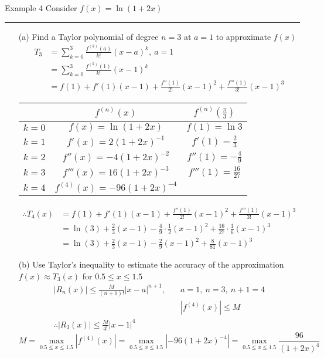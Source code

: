 \documentclass[12pt,a4paper]{article}
\begin{document}
\begin{eg}{Example 4}
	Consider $f(x)=\ln{(1+2x)}$\\
	\noindent\rule[0.25\baselineskip]{\textwidth}{1pt}
	\begin{enumerate}
		\item[(a)] Find a Taylor polynomial of degree $n=3$ at $a=1$ to approximate $f(x)$
		$$\begin{aligned}
			T_3&=\sum^3_{k=0}\frac{f^{(k)}(a)}{k!}(x-a)^k,\ a=1\\
			&=\sum^3_{k=0}\frac{f^{(k)}(1)}{k!}(x-1)^k\\
			&=f(1)+f'(1)(x-1)+\frac{f''(1)}{2!}(x-1)^2+\frac{f'''(1)}{3!}(x-1)^3
		\end{aligned}$$
		\begin{center}
			\begin{tabular}{c|c|c}
				&$f^{(n)}(x)$ & $f^{(n)}\left(\frac{\pi}{3}\right)$\\
				\hline
				$k=0$&$f(x)=\ln{(1+2x)}$&$f(1)=\ln{3}$\\
				$k=1$&$f'(x)=2(1+2x)^{-1}$&$f'(1)=\frac{2}{3}$\\
				$k=2$&$f''(x)=-4(1+2x)^{-2}$&$f''(1)=-\frac{4}{9}$\\
				$k=3$&$f'''(x)=16(1+2x)^{-3}$&$f'''(1)=\frac{16}{27}$\\
				$k=4$&$f^{(4)}(x)=-96(1+2x)^{-4}$&
			\end{tabular}
		\end{center}
		$$\begin{aligned}
			\therefore T_4(x)&=f(1)+f'(1)(x-1)+\frac{f''(1)}{2!}(x-1)^2+\frac{f'''(1)}{3!}(x-1)^3\\
			&=\ln(3)+\frac{2}{3}(x-1)-\frac{4}{9}\cdot\frac{1}{2}(x-1)^2+\frac{16}{27}\cdot\frac{1}{6}(x-1)^3\\
			&=\ln(3)+\frac{2}{3}(x-1)-\frac{2}{9}(x-1)^2+\frac{8}{81}(x-1)^3
		\end{aligned}$$
		\item[(b)] Use Taylor's inequality to estimate the accuracy of the approximation $f(x)\approx T_3(x)$ for $0.5\leq x\leq 1.5$
		$$\begin{aligned}
			|R_n(x)|\leq\frac{M}{(n+1)!}|x-a|^{n+1},\quad &a=1,\ n=3,\ n+1=4\\
			&|f^{(4)}(x)|\leq M\\
			\therefore|R_3(x)|\leq\frac{M}{4!}|x-1|^4&
		\end{aligned}$$
		$$M=\max_{0.5\leq x\leq 1.5}|f^{(4)}(x)|=\max_{0.5\leq x\leq 1.5}|-96(1+2x)^{-4}|=\max_{0.5\leq x\leq 1.5}\frac{96}{(1+2x)^4}$$
		\begin{itemize}

\end{itemize}
\end{enumerate}
\end{eg}
\end{document}
